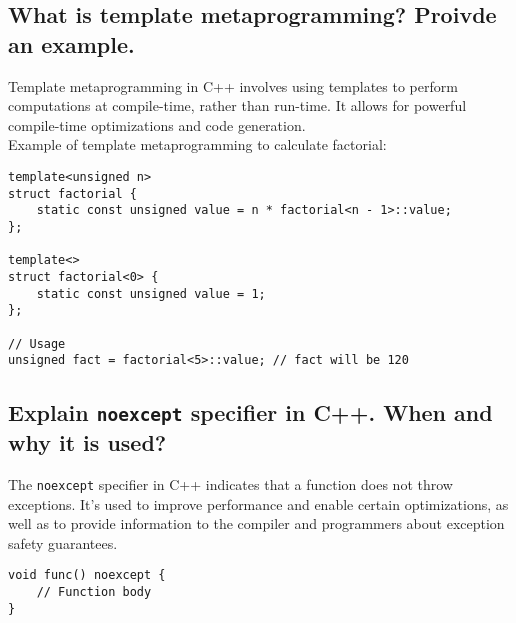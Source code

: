 \subsection{What is template metaprogramming? Proivde an example.}
Template metaprogramming in C++ involves using templates to perform computations at compile-time, rather than run-time. It allows for powerful compile-time optimizations and code generation. \\
Example of template metaprogramming to calculate factorial:
\begin{tcolorbox}[title=Template Metaprogramming]
\begin{verbatim}
template<unsigned n>
struct factorial {
    static const unsigned value = n * factorial<n - 1>::value;
};

template<>
struct factorial<0> {
    static const unsigned value = 1;
};

// Usage
unsigned fact = factorial<5>::value; // fact will be 120
\end{verbatim}
\end{tcolorbox}

\subsection{Explain \texttt{noexcept} specifier in C++. When and why it is used?}
The \texttt{noexcept} specifier in C++ indicates that a function does not throw exceptions. It's used to improve performance and enable certain optimizations, as well as to provide information to the compiler and programmers about exception safety guarantees.
\begin{tcolorbox}[title=\texttt{noexcept}]
\begin{verbatim}
void func() noexcept {
    // Function body
}
\end{verbatim}
\end{tcolorbox}

